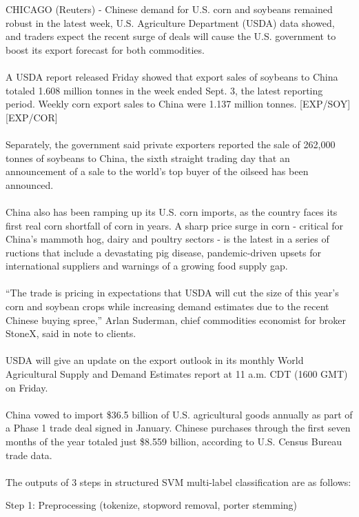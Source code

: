 CHICAGO (Reuters) - Chinese demand for U.S. corn and soybeans remained robust in the latest week, U.S. Agriculture Department (USDA) data showed, and traders expect the recent surge of deals will cause the U.S. government to boost its export forecast for both commodities.
\\\\
A USDA report released Friday showed that export sales of soybeans to China totaled 1.608 million tonnes in the week ended Sept. 3, the latest reporting period. Weekly corn export sales to China were 1.137 million tonnes. [EXP/SOY] [EXP/COR]
\\\\
Separately, the government said private exporters reported the sale of 262,000 tonnes of soybeans to China, the sixth straight trading day that an announcement of a sale to the world’s top buyer of the oilseed has been announced.
\\\\
China also has been ramping up its U.S. corn imports, as the country faces its first real corn shortfall of corn in years. A sharp price surge in corn - critical for China’s mammoth hog, dairy and poultry sectors - is the latest in a series of ructions that include a devastating pig disease, pandemic-driven upsets for international suppliers and warnings of a growing food supply gap.
\\\\
“The trade is pricing in expectations that USDA will cut the size of this year’s corn and soybean crops while increasing demand estimates due to the recent Chinese buying spree,” Arlan Suderman, chief commodities economist for broker StoneX, said in note to clients.
\\\\
USDA will give an update on the export outlook in its monthly World Agricultural Supply and Demand Estimates report at 11 a.m. CDT (1600 GMT) on Friday.
\\\\
China vowed to import \$36.5 billion of U.S. agricultural goods annually as part of a Phase 1 trade deal signed in January. Chinese purchases through the first seven months of the year totaled just \$8.559 billion, according to U.S. Census Bureau trade data.
\\\\
The outputs of 3 steps in structured SVM multi-label classification are as follows:

Step 1: Preprocessing (tokenize, stopword removal, porter stemming)

